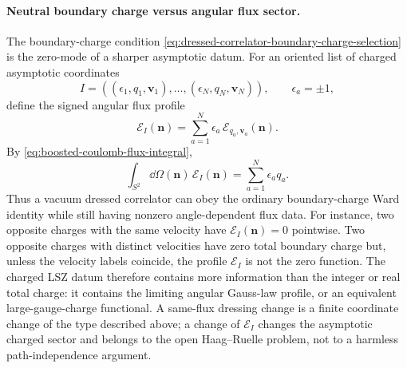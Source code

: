 \paragraph{Neutral boundary charge versus angular flux sector.}
The boundary-charge condition
\eqref{eq:dressed-correlator-boundary-charge-selection} is the zero-mode of
a sharper asymptotic datum.  For an oriented list of charged asymptotic
coordinates
\[
  I=((\epsilon_1,q_1,\mathbf v_1),\ldots,
     (\epsilon_N,q_N,\mathbf v_N)),
  \qquad \epsilon_a=\pm1,
\]
define the signed angular flux profile
\begin{equation}
  \mathcal E_I(\mathbf n)
  =
  \sum_{a=1}^{N}\epsilon_a\,
  \mathcal E_{q_a,\mathbf v_a}(\mathbf n).
  \label{eq:charged-multiparticle-angular-flux-profile}
\end{equation}
By \eqref{eq:boosted-coulomb-flux-integral},
\[
  \int_{S^2}\dd\Omega(\mathbf n)\,\mathcal E_I(\mathbf n)
  =
  \sum_{a=1}^{N}\epsilon_a q_a .
\]
Thus a vacuum dressed correlator can obey the ordinary boundary-charge Ward
identity while still having nonzero angle-dependent flux data.  For instance,
two opposite charges with the same velocity have
\(\mathcal E_I(\mathbf n)=0\) pointwise.  Two opposite charges with distinct
velocities have zero total boundary charge but, unless the velocity labels
coincide, the profile \(\mathcal E_I\) is not the zero function.  The
charged LSZ datum therefore contains more information than the integer or
real total charge: it contains the limiting angular Gauss-law profile, or an
equivalent large-gauge-charge functional.  A same-flux dressing change is a
finite coordinate change of the type described above; a change of
\(\mathcal E_I\) changes the asymptotic charged sector and belongs to the
open Haag--Ruelle problem, not to a harmless path-independence argument.

